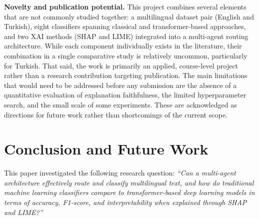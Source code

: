 \documentclass[conference]{IEEEtran}
\begin{document}
\textbf{Novelty and publication potential.} This project combines several elements that are
not commonly studied together: a multilingual dataset pair (English and Turkish), eight
classifiers spanning classical and transformer-based approaches, and two XAI methods (SHAP
and LIME) integrated into a multi-agent routing architecture. While each component
individually exists in the literature, their combination in a single comparative study is
relatively uncommon, particularly for Turkish. That said, the work is primarily an
applied, course-level project rather than a research contribution targeting publication.
The main limitations that would need to be addressed before any submission are the absence
of a quantitative evaluation of explanation faithfulness, the limited hyperparameter search,
and the small scale of some experiments. These are acknowledged as directions for future
work rather than shortcomings of the current scope.

\section{Conclusion and Future Work}
\label{sec:conclusion}

This paper investigated the following research question: \textit{``Can a multi-agent
architecture effectively route and classify multilingual text, and how do traditional
machine learning classifiers compare to transformer-based deep learning models in terms of
accuracy, F1-score, and interpretability when explained through SHAP and LIME?''}
\end{document}
